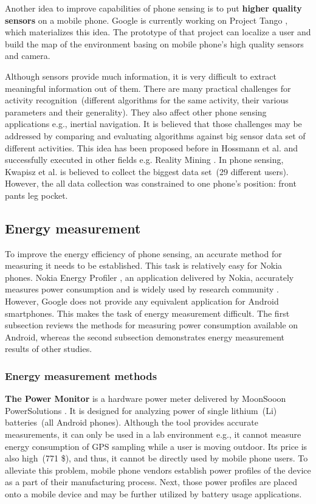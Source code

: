 Another idea to improve capabilities of phone sensing is to put \textbf{higher quality sensors} on a mobile phone. Google is currently working on Project Tango \cite{google:tango}, which materializes this idea. The prototype of that project can localize a user and build the map of the environment basing on mobile phone's high quality sensors and camera. 		
		
Although sensors provide much information, it is very difficult to extract meaningful information out of them. There are many practical challenges for activity recognition\ (different algorithms for the same activity, their various parameters and their generality). They also affect other phone sensing applications e.g., inertial navigation. It is believed that those challenges may be addressed by comparing and evaluating algorithms against big sensor data set of different activities. This idea has been proposed before in Hossmann et al.\cite{hossmann:bigdatasets} and successfully executed in other fields e.g. Reality Mining \cite{eagle:realitymining}. In phone sensing, Kwapisz et al. \cite{Kwapisz2011} is believed to collect the biggest data set\ (29 different users). However, the all data collection was constrained to one phone's position: front pants leg pocket. 
		
\subsection{Energy measurement}
\hspace{10pt} To improve the energy efficiency of phone sensing, an accurate method for measuring it needs to be established. This task is relatively easy for Nokia phones. Nokia Energy Profiler \cite{nokia:profiler}, an application delivered by Nokia,  accurately measures power consumption and is widely used by research community \cite{kjaergaard:entracked} \cite{lu:jigsaw} \cite{li:status}. However, Google does not provide any equivalent application for Android smartphones. This makes the task of energy measurement difficult. The first subsection reviews the methods for measuring power consumption available on Android, whereas the second subsection demonstrates energy measurement results of other studies.

\subsubsection{Energy measurement methods}
\hspace{10pt} \textbf{The Power Monitor} is a hardware power meter delivered by MoonSooon PowerSolutions \cite{monsoon:powermonitor}.  It is designed for analyzing power of single lithium\ (Li) batteries\ (all Android phones). Although the tool provides accurate measurements, it can only be used in a lab environment e.g., it cannot measure energy consumption of GPS sampling while a user is moving outdoor. Its price is also high\ (771 \$), and thus, it cannot be directly used by mobile phone users. To alleviate this problem, mobile phone vendors establish power profiles of the device as a part of their manufacturing process. Next, those power profiles are placed onto a mobile device \cite{android:powerprofiles} and may be further utilized by battery usage applications.

